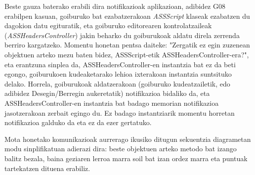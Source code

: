 Beste gauza baterako erabili dira notifikazioak aplikazioan, adibidez G08 erabilpen kasuan, goiburuko bat ezabatzerakoan \textit{ASSScript} klaseak ezabatzen du dagokion datu egituratik, eta goiburuko editorearen kontrolatzaileak (\textit{ASSHeadersController}) jakin beharko du goiburukoak aldatu direla zerrenda berriro kargatzeko. Momentu honetan pentsa daiteke: "Zergatik ez egin zuzenean objektuen arteko mezu baten bidez, ASSScript-etik ASSHeadersController-era?", eta erantzuna sinplea da, ASSHeadersController-en instantzia bat ez da beti egongo, goiburukoen kudeaketarako lehioa ixterakoan instantzia suntsituko delako. Horrela, goiburukoak aldatzerakoan (goiburuko kudeatzailetik, edo adibidez Desegin/Berregin aukeretatik) notifikazioa bidaliko da, eta ASSHeadersController-en instantzia bat badago memorian notifikazioa jasotzerakoan zerbait egingo du. Ez badago instantziarik momentu horretan notifikazioa galduko da eta ez da ezer gertatuko.

Mota honetako komunikazioak aurrerago ikusiko ditugun sekuentzia diagrametan modu sinplifikatuan adierazi dira: beste objektuen arteko metodo bat izango balitz bezala, baina geziaren lerroa marra soil bat izan ordez marra eta puntuak tartekatzen dituena erabiliz.

